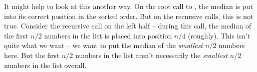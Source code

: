 \begin{prob}
\begin{soln}
        It might help to look at this another way. On the root call to
        , the median is put into its correct position in the
        sorted order. But on the recursive calls, this is not true. Consider
        the recursive call on the left half -- during this call, the median of
        the first $n/2$ numbers in the list is placed into position $n/4$
        (roughly). This isn't quite what we want -- we want to put the median
        of the \emph{smallest} $n/2$ numbers here. But the first $n/2$ numbers
        in the list aren't necessarily the \emph{smallest} $n/2$ numbers in the
        list overall.

    \end{soln}

\end{prob}

